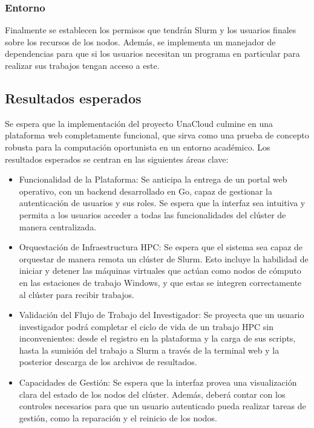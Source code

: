 \subsubsection{Entorno}
Finalmente se establecen los permisos que tendrán Slurm y los usuarios finales sobre los recursos de los nodos. Además, se implementa un manejador de dependencias para que si los usuarios necesitan un programa en particular para realizar sus trabajos tengan acceso a este.


\subsection{Resultados esperados}
Se espera que la implementación del proyecto UnaCloud culmine en una plataforma web completamente funcional, que sirva como una prueba de concepto robusta para la computación oportunista en un entorno académico. Los resultados esperados se centran en las siguientes áreas clave:

\begin{itemize}
    \item Funcionalidad de la Plataforma: Se anticipa la entrega de un portal web operativo, con un backend desarrollado en Go, capaz de gestionar la autenticación de usuarios y sus roles. Se espera que la interfaz sea intuitiva y permita a los usuarios acceder a todas las funcionalidades del clúster de manera centralizada.
    
    \item Orquestación de Infraestructura HPC: Se espera que el sistema sea capaz de orquestar de manera remota un clúster de Slurm. Esto incluye la habilidad de iniciar y detener las máquinas virtuales que actúan como nodos de cómputo en las estaciones de trabajo Windows, y que estas se integren correctamente al clúster para recibir trabajos.
    
    \item Validación del Flujo de Trabajo del Investigador: Se proyecta que un usuario investigador podrá completar el ciclo de vida de un trabajo HPC sin inconvenientes: desde el registro en la plataforma y la carga de sus scripts, hasta la sumisión del trabajo a Slurm a través de la terminal web y la posterior descarga de los archivos de resultados.
    
    \item Capacidades de Gestión: Se espera que la interfaz provea una visualización clara del estado de los nodos del clúster. Además, deberá contar con los controles necesarios para que un usuario autenticado pueda realizar tareas de gestión, como la reparación y el reinicio de los nodos.
\end{itemize}

